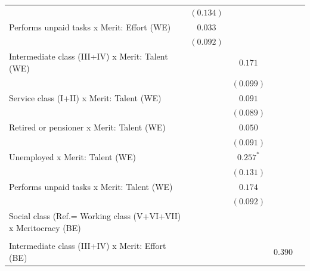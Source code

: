 \documentclass[
  12pt,
]{article}
\begin{document}
\begin{table}
\begin{center}
{\begin{tabular}{l c c c c}
                                                                & $(0.134)$   &             &             &             \\
\quad Performs unpaid tasks x Merit: Effort (WE)                & $0.033$     &             &             &             \\
                                                                & $(0.092)$   &             &             &             \\
\quad Intermediate class (III+IV) x Merit: Talent (WE)          &             & $0.171$     &             &             \\
                                                                &             & $(0.099)$   &             &             \\
\quad Service class (I+II) x Merit: Talent (WE)                 &             & $0.091$     &             &             \\
                                                                &             & $(0.089)$   &             &             \\
\quad Retired or pensioner x Merit: Talent (WE)                 &             & $0.050$     &             &             \\
                                                                &             & $(0.091)$   &             &             \\
\quad Unemployed x Merit: Talent (WE)                           &             & $0.257^{*}$ &             &             \\
                                                                &             & $(0.131)$   &             &             \\
\quad Performs unpaid tasks x Merit: Talent (WE)                &             & $0.174$     &             &             \\
                                                                &             & $(0.092)$   &             &             \\
Social class (Ref.= Working class (V+VI+VII) x Meritocracy (BE) &             &             &             &             \\
                                                                &             &             &             &             \\
\quad Intermediate class (III+IV) x Merit: Effort (BE)          &             &             & $0.390$     &             \\

\end{tabular}}
\end{center}
\end{table}
\end{document}
